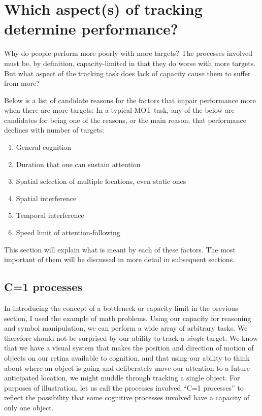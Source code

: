 \documentclass[]{book}
\providecommand{\tightlist}{%
  \setlength{\itemsep}{0pt}\setlength{\parskip}{0pt}}
\begin{document}
\hypertarget{which-aspects-of-tracking-determine-performance}{%
\chapter{Which aspect(s) of tracking determine performance?}\label{which-aspects-of-tracking-determine-performance}}

Why do people perform more poorly with more targets? The processes involved must be, by definition, capacity-limited in that they do worse with more targets. But what aspect of the tracking task does lack of capacity cause them to suffer from more?

Below is a list of candidate reasons for the factors that impair performance more when there are more targets:
In a typical MOT task, any of the below are candidates for being one of the reasons, or the main reason, that performance declines with number of targets:

\begin{enumerate}
\def\labelenumi{\arabic{enumi}.}
\tightlist
\item
  General cognition
\item
  Duration that one can sustain attention
\item
  Spatial selection of multiple locations, even static ones
\item
  Spatial interference
\item
  Temporal interference
\item
  Speed limit of attention-following
\end{enumerate}

This section will explain what is meant by each of these factors. The most important of them will be discussed in more detail in subsequent sections.

\hypertarget{c1-processes}{%
\section{C=1 processes}\label{c1-processes}}

In introducing the concept of a bottleneck or capacity limit in the previous section, I used the example of math problems. Using our capacity for reasoning and symbol manipulation, we can perform a wide array of arbitrary tasks. We therefore should not be surprised by our ability to track a \emph{single} target. We know that we have a visual system that makes the position and direction of motion of objects on our retina available to cognition, and that using our ability to think about where an object is going and deliberately move our attention to a future anticipated location, we might muddle through tracking a single object. For purposes of illustration, let us call the processes involved ``C=1 processes'' to reflect the possibility that some cognitive processes involved have a capacity of only one object.
\end{document}
